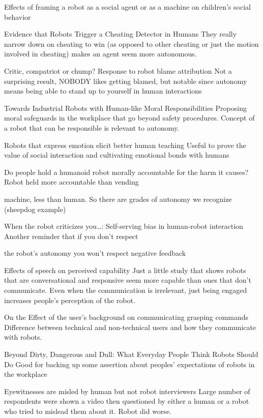 \documentclass{sfuthesis}
\begin{document}
Effects of framing a robot as a social agent or as a machine on children's social behavior

Evidence that Robots Trigger a Cheating Detector in Humans	They really narrow down on cheating to win (as opposed to other cheating or just the motion involved in cheating) makes an agent seem more autonomous.	

Critic, compatriot or chump? Response to robot blame attribution	Not a surprising result, NOBODY likes getting blamed, but notable since autonomy means being able to stand up to yourself in human interactions	

Towards Industrial Robots with Human-like Moral Responsibilities	Proposing moral safeguards in the workplace that go beyond safety procedures. Concept of a robot that can be responsible is relevant to autonomy.	

Robots that express emotion elicit better human teaching	Useful to prove the value of social interaction and cultivating emotional bonds with humans	

Do people hold a humanoid robot morally accountable for the harm it causes?	Robot held more accountable than vending 

machine, less than human. So there are grades of autonomy we recognize (sheepdog example)	

When the robot criticizes you…: Self-serving bias in human-robot interaction	Another reminder that if you don't respect 

the robot's autonomy you won't respect negative feedback	

Effects of speech on perceived capability	Just a little study that shows robots that are conversational and responsive seem more capable than ones that don't communicate. Even when the communication is irrelevant, just being engaged increases people's perception of the robot.	

On the Effect of the user's background on communicating grasping commands	Difference between technical and non-technical users and how they communicate with robots.

Beyond Dirty, Dangerous and Dull: What Everyday People Think Robots Should Do	Good for backing up some assertion about peoples' expectations of robots in the workplace	


Eyewitnesses are misled by human but not robot interviewers	Large number of respondents were shown a video then questioned by either a human or a robot who tried to mislead them about it. Robot did worse.	
\end{document}
